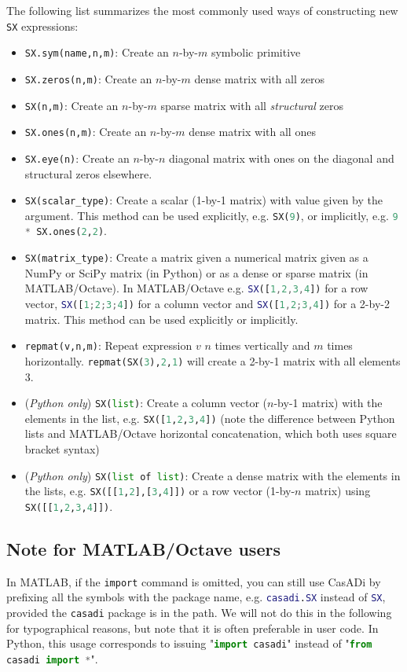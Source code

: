 \documentclass[a4paper,12pt]{book}
\newcommand{\python}[1]{\lstinline[language=Python]{#1}}
\newcommand{\matlab}[1]{\lstinline[language=Matlab]{#1}}
\begin{document}
The following list summarizes the most commonly used ways of constructing new \texttt{SX} expressions:
\begin{itemize}
  \item \python{SX.sym(name,n,m)}: Create an $n$-by-$m$ symbolic primitive
  \item \python{SX.zeros(n,m)}: Create an $n$-by-$m$ dense matrix with all zeros
  \item \python{SX(n,m)}: Create an $n$-by-$m$ sparse matrix with all \emph{structural} zeros
  \item \python{SX.ones(n,m)}: Create an $n$-by-$m$ dense matrix with all ones
  \item \python{SX.eye(n)}: Create an $n$-by-$n$ diagonal matrix with ones on the diagonal and structural zeros elsewhere.
  \item \python{SX(scalar_type)}: Create a scalar (1-by-1 matrix) with value given by the argument. This method can be used explicitly, e.g. \python{SX(9)}, or implicitly, e.g. \python{9 * SX.ones(2,2)}.
  \item \python{SX(matrix_type)}: Create a matrix given a numerical matrix given as a NumPy or SciPy matrix (in Python) or as a dense or sparse matrix (in MATLAB/Octave). In MATLAB/Octave e.g.
  \matlab{SX([1,2,3,4])} for a row vector, \matlab{SX([1;2;3;4])} for a column vector and \matlab{SX([1,2;3,4])} for a 2-by-2 matrix. This method can be used explicitly or implicitly.
  \item \python{repmat(v,n,m)}: Repeat expression $v$ $n$ times vertically and $m$ times horizontally. \python{repmat(SX(3),2,1)} will create a 2-by-1 matrix with all elements 3.
  \item (\emph{Python only}) \python{SX(list)}: Create a column vector ($n$-by-1 matrix) with the elements in the list, e.g. \python{SX([1,2,3,4])} (note the difference between Python lists and MATLAB/Octave horizontal concatenation, which both uses square bracket syntax)
  \item (\emph{Python only}) \python{SX(list of list)}: Create a dense matrix with the elements in the lists, e.g. \python{SX([[1,2],[3,4]])} or a row vector (1-by-$n$ matrix) using \python{SX([[1,2,3,4]])}.
\end{itemize}

\subsection*{Note for MATLAB/Octave users}
In MATLAB, if the \texttt{import} command is omitted, you can still use CasADi by prefixing all the symbols with the package name, e.g. \matlab{casadi.SX} instead of \matlab{SX}, provided the \texttt{casadi} package is in the path. We will not do this in the following for typographical reasons, but note that it is often preferable in user code. In Python, this usage corresponds to issuing "\python{import casadi}" instead of "\python{from casadi import *}".
\end{document}
